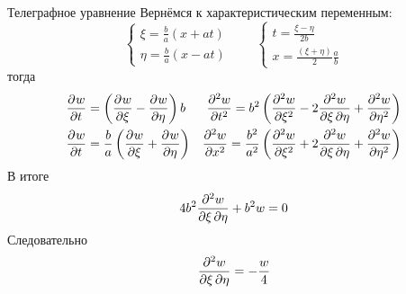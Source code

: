 \begin{example}{Телеграфное уравнение}
Вернёмся к характеристическим переменным:
\[
	\begin{cases}
		\xi = \frac{b}{a}(x + at)\\
		\eta = \frac{b}{a}(x - at)
	\end{cases}
	\qquad
	\begin{cases}
		t = \frac{\xi - \eta}{2b}\\
		x = \frac{(\xi + \eta)}{2}\frac{a}{b}
	\end{cases}
\]
тогда 
\begin{align*}
	&\frac{\partial^{}w}{\partial t^{}} = \left(\frac{\partial^{}w}{\partial \xi^{}} - \frac{\partial^{}w}{\partial \eta^{}} \right)b &\frac{\partial^{2}w}{\partial t^{2}} = b^2 \left(\frac{\partial^{2}w}{\partial \xi^{2}} - 2 \frac{\partial^2w}{\partial \xi\, \partial \eta} + \frac{\partial^{2}w}{\partial \eta^{2}} \right)\\
	&\frac{\partial^{}w}{\partial t^{}} = \frac{b}{a} \left(\frac{\partial^{}w}{\partial \xi^{}}  + \frac{\partial^{}w}{\partial \eta^{}}\right)
	&\frac{\partial^{2}w}{\partial x^{2}} = \frac{b^2}{a^2} \left(\frac{\partial^{2}w}{\partial \xi^{2}} + 2 \frac{\partial^2w}{\partial \xi\, \partial \eta} + \frac{\partial^{2}w}{\partial \eta^{2}} \right)
\end{align*}
В итоге
\[
	4 b^2 \frac{\partial^2w}{\partial \xi\, \partial \eta} + b^2 w = 0
\]
Следовательно
\[
	\frac{\partial^2w}{\partial \xi\, \partial \eta} = - \frac{w}{4}
\]
\end{example}

